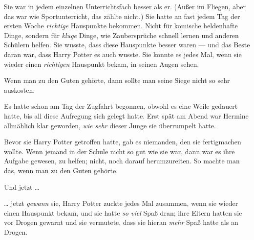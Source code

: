 Sie war in jedem einzelnen Unterrichtsfach besser als er. (Außer im Fliegen, aber das war wie Sportunterricht, das zählte nicht.) Sie hatte an fast jedem Tag der ersten Woche \emph{richtige} Hauspunkte bekommen. Nicht für komische heldenhafte Dinge, sondern für \emph{kluge} Dinge, wie Zaubersprüche schnell lernen und anderen Schülern helfen. Sie wusste, dass diese Hauspunkte besser waren — und das Beste daran war, dass Harry Potter es auch wusste. Sie konnte es jedes Mal, wenn sie wieder einen \emph{richtigen} Hauspunkt bekam, in seinen Augen sehen.

Wenn man zu den Guten gehörte, dann sollte man seine Siege nicht so sehr auskosten.

Es hatte schon am Tag der Zugfahrt begonnen, obwohl es eine Weile gedauert hatte, bis all diese Aufregung sich gelegt hatte. Erst spät am Abend war Hermine allmählich klar geworden, \emph{wie sehr} dieser Junge sie überrumpelt hatte.

Bevor sie Harry Potter getroffen hatte, gab es niemanden, den sie fertigmachen wollte. Wenn jemand in der Schule nicht so gut wie sie war, dann war es ihre Aufgabe gewesen, zu helfen; nicht, noch darauf herumzureiten. So machte man das, wenn man zu den Guten gehörte.

Und jetzt …

… jetzt \emph{gewann} sie, Harry Potter zuckte jedes Mal zusammen, wenn sie wieder einen Hauspunkt bekam, und sie hatte \emph{so viel} Spaß dran; ihre Eltern hatten sie vor Drogen gewarnt und sie vermutete, dass sie hieran \emph{mehr} Spaß hatte als an Drogen.

